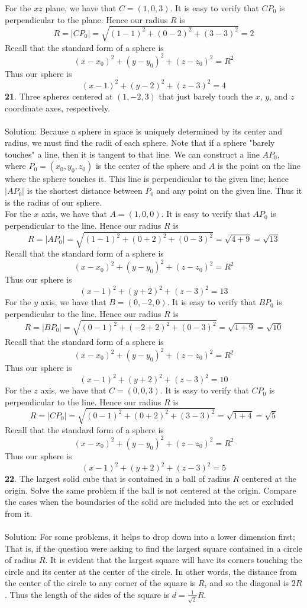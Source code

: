 \documentclass[12pt]{amsbook}
\begin{document}
For the $xz$ plane, we have that $C=(1,0,3)$. It is easy to verify that $CP_0$ is perpendicular to the plane. Hence our radius $R$ is
$$
R=|CP_0|=\sqrt{(1-1)^2+(0-2)^2+(3-3)^2}= 2
$$ 
Recall that the standard form of a sphere is
$$
(x-x_0)^2+(y-y_0)^2+(z-z_0)^2=R^2
$$
Thus our sphere is
$$
(x-1)^2+(y-2)^2+(z-3)^2=4
$$
{\small\bf 21}. Three spheres centered at $(1,-2,3)$ that just barely touch
the $x$, $y$, and $z$ coordinate axes, respectively.
\\
\\
{\sc Solution}:
Because a sphere in space is uniquely determined by its center and radius, we must find the radii of each sphere. Note that if a sphere "barely touches" a line, then it is tangent to that line. We can construct a line $AP_0$, where $P_0=(x_0,y_0,z_0)$ is the center of the sphere and $A$ is the point on the line where the sphere touches it. This line is perpendicular to the given line; hence $|AP_0|$ is the shortest distance between $P_0$ and any point on the given line. Thus it is the radius of our sphere. 
\\
For the $x$ axis, we have that $A=(1,0,0)$. It is easy to verify that $AP_0$ is perpendicular to the line. Hence our radius $R$ is
$$
R=|AP_0|=\sqrt{(1-1)^2+(0+2)^2+(0-3)^2}= \sqrt{4+9} = \sqrt{13}
$$ 
Recall that the standard form of a sphere is
$$
(x-x_0)^2+(y-y_0)^2+(z-z_0)^2=R^2
$$
Thus our sphere is
$$
(x-1)^2+(y+2)^2+(z-3)^2=13
$$
For the $y$ axis, we have that $B=(0,-2,0)$. It is easy to verify that $BP_0$ is perpendicular to the line. Hence our radius $R$ is
$$
R=|BP_0|=\sqrt{(0-1)^2+(-2+2)^2+(0-3)^2}= \sqrt{1+9} = \sqrt{10}
$$ 
Recall that the standard form of a sphere is
$$
(x-x_0)^2+(y-y_0)^2+(z-z_0)^2=R^2
$$
Thus our sphere is
$$
(x-1)^2+(y+2)^2+(z-3)^2=10
$$
For the $z$ axis, we have that $C=(0,0,3)$. It is easy to verify that $CP_0$ is perpendicular to the line. Hence our radius $R$ is
$$
R=|CP_0|=\sqrt{(0-1)^2+(0+2)^2+(3-3)^2}= \sqrt{1+4} = \sqrt{5}
$$ 
Recall that the standard form of a sphere is
$$
(x-x_0)^2+(y-y_0)^2+(z-z_0)^2=R^2
$$
Thus our sphere is
$$
(x-1)^2+(y+2)^2+(z-3)^2=5
$$
{\small\bf 22}. The largest solid cube that is contained in a
ball of radius $R$ centered at the origin. Solve the same problem
if the ball is not centered at the origin. Compare the cases
when the boundaries of the solid are included into the set
or excluded from it.\\
\\
{\sc Solution}:
For some problems, it helps to drop down into a lower dimension first; That is, if the question were asking to find the largest square contained in a circle of radius $R$. It is evident that the largest square will have its corners touching the circle and its center at the center of the circle. In other words, the distance from the center of the circle to any corner of the square is $R$, and so the diagonal is $2R$. Thus the length of the sides of the square is $d=\frac{1}{\sqrt{2}}R$. 
\end{document}
